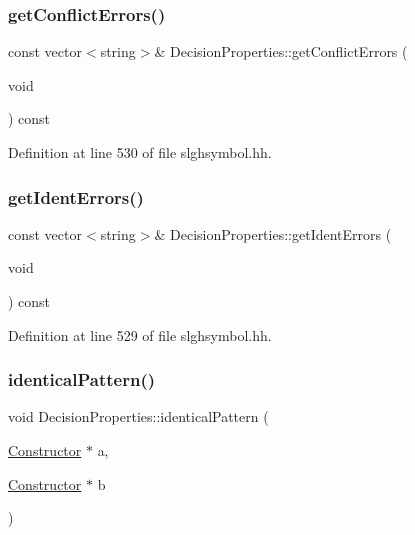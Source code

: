 \subsubsection{\texorpdfstring{getConflictErrors()}{getConflictErrors()}}
{\footnotesize\ttfamily const vector$<$string$>$\& Decision\+Properties\+::get\+Conflict\+Errors (\begin{DoxyParamCaption}\item[{void}]{ }\end{DoxyParamCaption}) const\hspace{0.3cm}{\ttfamily [inline]}}



Definition at line 530 of file slghsymbol.\+hh.

\mbox{\label{class_decision_properties_a6522455b1cde86da973a068d0c9abac5}} 
\subsubsection{\texorpdfstring{getIdentErrors()}{getIdentErrors()}}
{\footnotesize\ttfamily const vector$<$string$>$\& Decision\+Properties\+::get\+Ident\+Errors (\begin{DoxyParamCaption}\item[{void}]{ }\end{DoxyParamCaption}) const\hspace{0.3cm}{\ttfamily [inline]}}



Definition at line 529 of file slghsymbol.\+hh.

\mbox{\label{class_decision_properties_a49167e9686ae2506f357100d50848e40}} 
\subsubsection{\texorpdfstring{identicalPattern()}{identicalPattern()}}
{\footnotesize\ttfamily void Decision\+Properties\+::identical\+Pattern (\begin{DoxyParamCaption}\item[{\mbox{\hyperlink{class_constructor}{Constructor}} $\ast$}]{a,  }\item[{\mbox{\hyperlink{class_constructor}{Constructor}} $\ast$}]{b }\end{DoxyParamCaption})}




